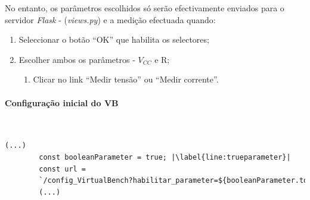 No entanto, os parâmetros escolhidos só serão efectivamente enviados para o servidor \textit{Flask} - (\textit{views.py}) e a medição efectuada quando:
\begin{enumerate}
	\item Seleccionar o botão ``OK'' que habilita os selectores;
	\item Escolher ambos os parâmetros - $V_{CC}$ e R;
	\begin{enumerate}
		\item Clicar no link ``Medir tensão'' ou ``Medir corrente''.
	\end{enumerate}
\end{enumerate}


\paragraph{Configuração inicial do VB} ~\\

\begin{center}
	\begin{minipage}{0.7\linewidth}
		\begin{lstlisting}[language=Html,escapechar=|, caption=Envio de parâmetros da página \textit{ohm.html} para o \textit{script views.py}, label=lst:exemploenvioparametros]
		(...)
		const booleanParameter = true; |\label{line:trueparameter}|
		const url = 
		`/config_VirtualBench?habilitar_parameter=${booleanParameter.toString()}`
		(...)
	\end{lstlisting}
	\end{minipage}
\end{center}

